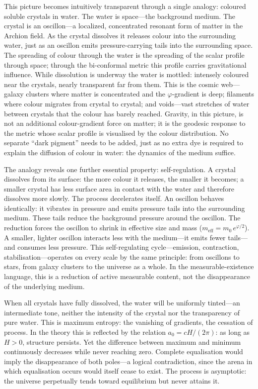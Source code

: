 \documentclass[aps,prd,onecolumn,superscriptaddress,nofootinbib,showpacs,12pt,notitlepage]{revtex4-2}
\newcommand{\meff}{m_{\mathrm{eff}}}
\begin{document}
This picture becomes intuitively transparent through a single
analogy: coloured soluble crystals in water.  The water is
space---the background medium.  The crystal is an oscillon---a
localized, concentrated resonant form of matter in the Archion
field.  As the crystal dissolves it releases colour into the
surrounding water, just as an oscillon emits pressure-carrying
tails into the surrounding space.  The
spreading of colour through the water is the spreading of
the scalar profile through space; through the bi-conformal
metric this profile carries gravitational influence.  While
dissolution is underway the water is
mottled: intensely coloured near the crystals, nearly
transparent far from them.  This is the cosmic web---galaxy
clusters where matter is concentrated and the
$\varphi$-gradient is deep; filaments where colour migrates
from crystal to crystal; and voids---vast stretches of water
between crystals that the colour has barely reached.  Gravity,
in this picture, is not an additional colour-gradient force
on matter; it is the geodesic response to the metric whose
scalar profile is visualised by the colour distribution.  No
separate ``dark pigment'' needs to be added, just as no extra
dye is required to explain the
diffusion of colour in water: the dynamics of the medium suffice.

The analogy reveals one further essential property:
self-regulation.  A crystal dissolves from its surface: the
more colour it releases, the smaller it becomes; a smaller
crystal has less surface area in contact with the water and
therefore dissolves more slowly.  The process decelerates
itself.  An oscillon behaves identically: it vibrates in pressure
and emits pressure tails into the
surrounding medium.  These tails reduce the background
pressure around the oscillon.  The reduction forces the
oscillon to shrink in effective size and mass
($\meff = m_0\,e^{\varphi/2}$).  A smaller, lighter oscillon
interacts less with the medium---it emits fewer tails---and
consumes less pressure.  This self-regulating cycle---emission,
contraction, stabilisation---operates on every scale by the
same principle: from oscillons to stars, from galaxy clusters
to the universe as a whole.
In the measurable-existence language, this is a reduction of active
measurable content, not the disappearance of the underlying medium.

When all crystals have fully dissolved, the water will be
uniformly tinted---an intermediate tone, neither the intensity
of the crystal nor the transparency of pure water.  This is
maximum entropy: the vanishing of gradients, the cessation of
process.  In the theory this is reflected by the relation
$a_0 = cH/(2\pi)$: as long as $H>0$, structure persists.
Yet the difference between maximum and minimum continuously
decreases while never reaching zero.  Complete equalisation
would imply the disappearance of both poles---a logical
contradiction, since the arena in which equalisation occurs
would itself cease to exist.  The process is asymptotic: the
universe perpetually tends toward equilibrium but never
attains it.
\end{document}

